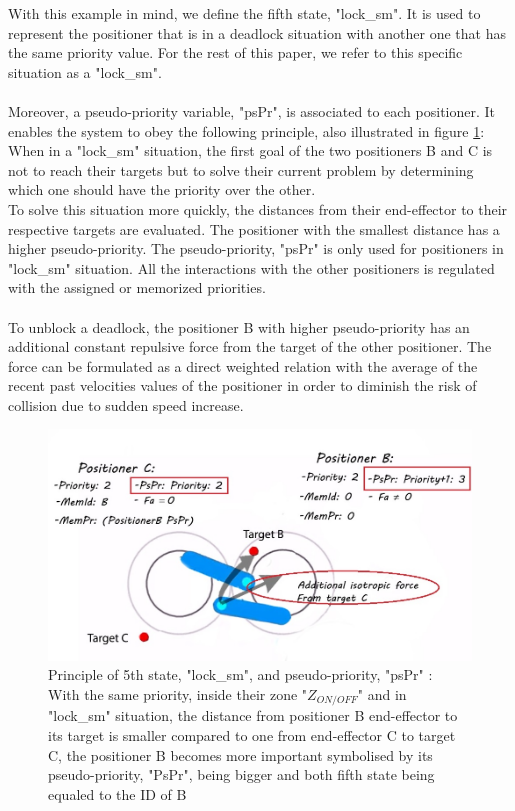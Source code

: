 \documentclass[]{spie}  %
\begin{document}
	With this example in mind, we define the fifth state, "lock\_sm". It is used to represent the positioner that is in a deadlock situation with another one that has the same priority value. For the rest of this paper, we refer to this specific situation as a "lock\_sm". \\\\
	Moreover, a pseudo-priority variable, "psPr", is associated to each positioner. It enables the system to obey the following principle, also illustrated in figure \ref{5thState}:\\
	When in a "lock\_sm" situation, the first goal of the two positioners B and C is not to reach their targets but to solve their current problem by determining which one should have the priority over the other. \\
	 To solve this situation more quickly, the distances from their end-effector to their respective targets are evaluated. The positioner with the smallest distance has a higher pseudo-priority. The pseudo-priority, "psPr" is only used for positioners in "lock\_sm" situation. All the interactions with the other positioners is regulated with the assigned or memorized priorities. \\\\
	To unblock a deadlock, the positioner B with higher pseudo-priority has an additional constant repulsive force from the target of the other positioner. The force can be formulated as a direct weighted relation with the average of the recent past velocities values of the positioner in order to diminish the risk of collision due to sudden speed increase.
	\begin{figure}[H]
		\centering
		\includegraphics[scale=0.4]{images/5thstate.jpg}
		\caption{\centering Principle of 5th state, "lock\_sm", and pseudo-priority, "psPr" :\\
		With the same priority, inside their zone "$Z_{ON/OFF}$" and in "lock\_sm" situation, the distance from positioner B end-effector to its target is smaller compared to one from end-effector C to target C, the positioner B becomes more important symbolised by its pseudo-priority, "PsPr", being bigger and both fifth state being equaled to the ID of B}
		\label{5thState}
	\end{figure}
\end{document}
